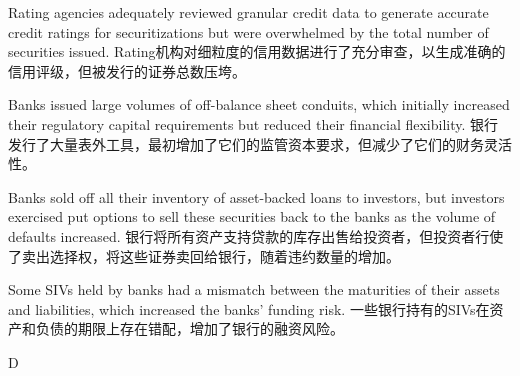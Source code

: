\documentclass{article}
\begin{document}
                \begin{choices}
                    \item Rating agencies adequately reviewed granular credit data to generate accurate credit ratings for securitizations but were overwhelmed by the total number of securities issued.  
                    Rating机构对细粒度的信用数据进行了充分审查，以生成准确的信用评级，但被发行的证券总数压垮。
                    \item Banks issued large volumes of off-balance sheet conduits, which initially increased their regulatory capital requirements but reduced their financial flexibility.  
                    银行发行了大量表外工具，最初增加了它们的监管资本要求，但减少了它们的财务灵活性。
                    \item Banks sold off all their inventory of asset-backed loans to investors, but investors exercised put options to sell these securities back to the banks as the volume of defaults increased.  
                    银行将所有资产支持贷款的库存出售给投资者，但投资者行使了卖出选择权，将这些证券卖回给银行，随着违约数量的增加。
                    \item Some SIVs held by banks had a mismatch between the maturities of their assets and liabilities, which increased the banks' funding risk.  
                    一些银行持有的SIVs在资产和负债的期限上存在错配，增加了银行的融资风险。
                \end{choices}
                
                \begin{correctanswer}
                D
                \end{correctanswer}
                
\end{document}
